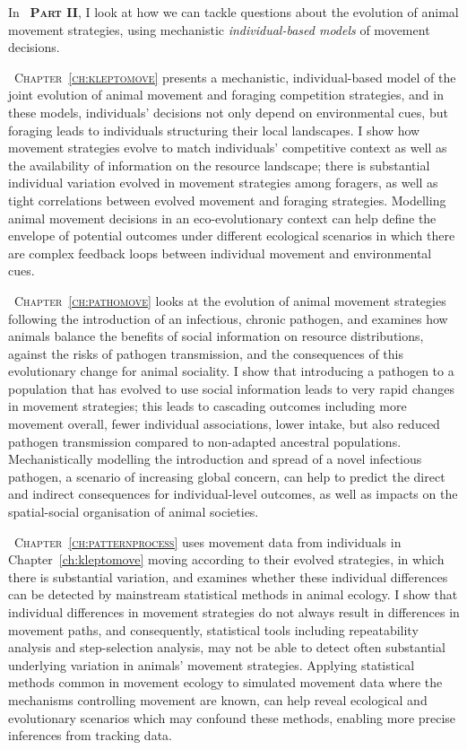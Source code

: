 \medskip

\noindent In {\scshape~\textbf{Part II}}, I look at how we can tackle questions about the evolution of animal movement strategies, using mechanistic \textit{individual-based models} of movement decisions.

\medskip

{\scshape~Chapter~\ref{ch:kleptomove}} presents a mechanistic, individual-based model of the joint evolution of animal movement and foraging competition strategies, and in these models, individuals' decisions not only depend on environmental cues, but foraging leads to individuals structuring their local landscapes.
I show how movement strategies evolve to match individuals' competitive context as well as the availability of information on the resource landscape; there is substantial individual variation evolved in movement strategies among foragers, as well as tight correlations between evolved movement and foraging strategies.
Modelling animal movement decisions in an eco-evolutionary context can help define the envelope of potential outcomes under different ecological scenarios in which there are complex feedback loops between individual movement and environmental cues.

{\scshape~Chapter~\ref{ch:pathomove}} looks at the evolution of animal movement strategies following the introduction of an infectious, chronic pathogen, and examines how animals balance the benefits of social information on resource distributions, against the risks of pathogen transmission, and the consequences of this evolutionary change for animal sociality.
I show that introducing a pathogen to a population that has evolved to use social information leads to very rapid changes in movement strategies; this leads to cascading outcomes including more movement overall, fewer individual associations, lower intake, but also reduced pathogen transmission compared to non-adapted ancestral populations.
Mechanistically modelling the introduction and spread of a novel infectious pathogen, a scenario of increasing global concern, can help to predict the direct and indirect consequences for individual-level outcomes, as well as impacts on the spatial-social organisation of animal societies.

{\scshape~Chapter~\ref{ch:patternprocess}} uses movement data from individuals in Chapter~\ref{ch:kleptomove} moving according to their evolved strategies, in which there is substantial variation, and examines whether these individual differences can be detected by mainstream statistical methods in animal ecology.
I show that individual differences in movement strategies do not always result in differences in movement paths, and consequently, statistical tools including repeatability analysis and step-selection analysis, may not be able to detect often substantial underlying variation in animals' movement strategies.
Applying statistical methods common in movement ecology to simulated movement data where the mechanisms controlling movement are known, can help reveal ecological and evolutionary scenarios which may confound these methods, enabling more precise inferences from tracking data.




\endgroup

\vfill

\cleardoublepage
